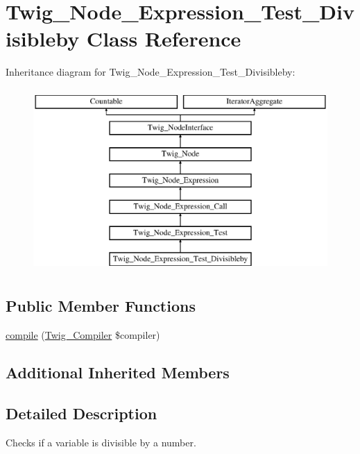 \hypertarget{classTwig__Node__Expression__Test__Divisibleby}{}\section{Twig\+\_\+\+Node\+\_\+\+Expression\+\_\+\+Test\+\_\+\+Divisibleby Class Reference}
\label{classTwig__Node__Expression__Test__Divisibleby}
Inheritance diagram for Twig\+\_\+\+Node\+\_\+\+Expression\+\_\+\+Test\+\_\+\+Divisibleby\+:\begin{figure}[H]
\begin{center}
\leavevmode
\includegraphics[height=7.000000cm]{classTwig__Node__Expression__Test__Divisibleby}
\end{center}
\end{figure}
\subsection*{Public Member Functions}
\begin{DoxyCompactItemize}
\item 
\hyperlink{classTwig__Node__Expression__Test__Divisibleby_a1ed4be345d9803223be021b9a852c27e}{compile} (\hyperlink{classTwig__Compiler}{Twig\+\_\+\+Compiler} \$compiler)
\end{DoxyCompactItemize}
\subsection*{Additional Inherited Members}


\subsection{Detailed Description}
Checks if a variable is divisible by a number.



